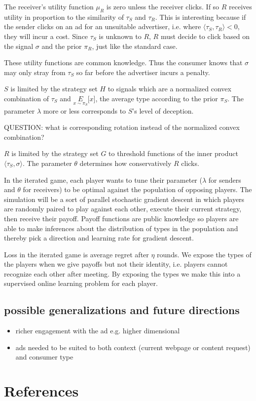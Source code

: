 \documentclass{article}
\begin{document}
The receiver's utility function $\mu_R$ is zero unless the receiver clicks. If so $R$ receives utility in proportion to the similarity of $\tau_S$ and $\tau_R$. This is interesting because if the sender clicks on an ad for an unsuitable advertiser, i.e. where $\langle \tau_S, \tau_R \rangle < 0$, they will incur a cost. Since $\tau_S$ is unknown to $R$, $R$ must decide to click based on the signal $\sigma$ and the prior $\pi_R$, just like the standard case.

These utility functions are common knowledge. Thus the consumer knows that $\sigma$ may only stray from $\tau_S$ so far before the advertiser incurs a penalty.

$S$ is limited by the strategy set $H$ to signals which are a normalized convex combination of $\tau_S$ and $\underset{x\sim\pi_S}{E}\lbrack x \rbrack$, the average type according to the prior $\pi_S$. The parameter $\lambda$ more or less corresponds to $S$'s level of deception.

QUESTION: what is corresponding rotation instead of the normalized convex combination?

$R$ is limited by the strategy set $G$ to threshold functions of the inner product $\langle \tau_S, \sigma \rangle$. The parameter $\theta$ determines how conservatively $R$ clicks.

In the iterated game, each player wants to tune their parameter ($\lambda$ for senders and $\theta$ for receivers) to be optimal against the population of opposing players. The simulation will be a sort of parallel stochastic gradient descent in which players are randomly paired to play against each other, execute their current strategy, then receive their payoff. Payoff functions are public knowledge so players are able to make inferences about the distribution of types in the population and thereby pick a direction and learning rate for gradient descent.

Loss in the iterated game is average regret after $\eta$ rounds. We expose the types of the players when we give payoffs but not their identity, i.e. players cannot recognize each other after meeting. By exposing the types we make this into a supervised online learning problem for each player.

\subsection{possible generalizations and future directions}

\begin{itemize}
	\item richer engagement with the ad e.g. higher dimensional
	\item ads needed to be suited to both context (current webpage or content request) and consumer type
\end{itemize}

\section{References}



\end{document}
